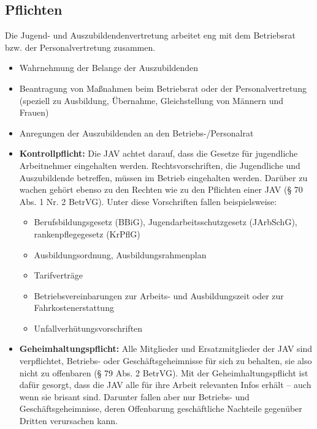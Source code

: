 \subsection{Pflichten}
{
Die Jugend- und Auszubildendenvertretung arbeitet eng mit dem Betriebsrat bzw. der Personalvertretung zusammen. 
}
\newline
\begin{itemize}
	\item  
	Wahrnehmung der Belange der Auszubildenden
	\item
	Beantragung von Maßnahmen beim Betriebsrat oder der Personalvertretung (speziell zu Ausbildung, Übernahme, Gleichstellung von Männern und Frauen)
	\item
	Anregungen der Auszubildenden an den Betriebs-/Personalrat
	\item
	\textbf{Kontrollpflicht:}
	\newline
	Die JAV achtet darauf, dass die Gesetze für jugendliche Arbeitnehmer eingehalten werden. \newline
	Rechtsvorschriften, die Jugendliche und Auszubildende betreffen, müssen im Betrieb eingehalten werden. \newline
	Darüber zu wachen gehört ebenso zu den Rechten wie zu den Pflichten einer JAV (§ 70 Abs. 1 Nr. 2 BetrVG). \newline
	Unter diese Vorschriften fallen beispielsweise:
	\begin{itemize}
		\item 
		Berufsbildungsgesetz (BBiG), Jugendarbeitsschutzgesetz (JArbSchG), rankenpflegegesetz (KrPflG)
		\item
		Ausbildungsordnung, Ausbildungsrahmenplan
		\item
		Tarifverträge
		\item
		Betriebsvereinbarungen zur Arbeits- und Ausbildungszeit oder zur Fahrkostenerstattung
		\item
		Unfallverhütungsvorschriften
	\end{itemize}
	\item 
	\textbf{Geheimhaltungspflicht:}
	\newline
	{
		Alle Mitglieder und Ersatzmitglieder der JAV sind verpflichtet, Betriebs- oder Geschäftsgeheimnisse für sich zu behalten, sie also nicht zu offenbaren (§ 79 Abs. 2 BetrVG). Mit der Geheimhaltungspflicht ist dafür gesorgt, dass die JAV alle für ihre Arbeit relevanten Infos erhält – auch wenn sie brisant sind.
	 	\newline
	 	Darunter fallen aber nur Betriebs- und Geschäftsgeheimnisse, deren Offenbarung geschäftliche Nachteile gegenüber Dritten verursachen kann. \newline 
}
\end{itemize}
